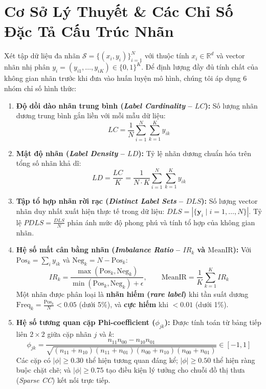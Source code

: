 \documentclass[11pt,a4paper]{article}
\begin{document}
\section{Cơ Sở Lý Thuyết \& Các Chỉ Số Đặc Tả Cấu Trúc Nhãn}
Xét tập dữ liệu đa nhãn $\mathcal{S} = \{(x_i, y_i)\}_{i=1}^N$ với thuộc tính $x_i \in \mathbb{R}^d$ và vector nhãn nhị phân $y_i = (y_{i1}, \dots, y_{iK}) \in \{0, 1\}^K$. Để định lượng đầy đủ tính chất của không gian nhãn trước khi đưa vào huấn luyện mô hình, chúng tôi áp dụng 6 nhóm chỉ số hình thức:
\begin{enumerate}[leftmargin=*]
  \item \textbf{Độ dồi dào nhãn trung bình (\textit{Label Cardinality} -- $LC$):} Số lượng nhãn dương trung bình gắn liền với mỗi mẫu dữ liệu:
  \begin{equation}
    LC = \frac{1}{N} \sum_{i=1}^N \sum_{k=1}^K y_{ik}
  \end{equation}
  \item \textbf{Mật độ nhãn (\textit{Label Density} -- $LD$):} Tỷ lệ nhãn dương chuẩn hóa trên tổng số nhãn khả dĩ:
  \begin{equation}
    LD = \frac{LC}{K} = \frac{1}{N \cdot K} \sum_{i=1}^N \sum_{k=1}^K y_{ik}
  \end{equation}
  \item \textbf{Tập tổ hợp nhãn rời rạc (\textit{Distinct Label Sets} -- $DLS$):} Số lượng vector nhãn duy nhất xuất hiện thực tế trong dữ liệu: $DLS = |\{\mathbf{y}_i \mid i=1,\dots,N\}|$. Tỷ lệ $PDLS = \frac{DLS}{N}$ phản ánh mức độ phong phú và tính tổ hợp của không gian nhãn.
  \item \textbf{Hệ số mất cân bằng nhãn (\textit{Imbalance Ratio} -- $IR_k$ và $\mathrm{MeanIR}$):} Với $\mathrm{Pos}_k = \sum_{i} y_{ik}$ và $\mathrm{Neg}_k = N - \mathrm{Pos}_k$:
  \begin{equation}
    IR_k = \frac{\max(\mathrm{Pos}_k, \mathrm{Neg}_k)}{\min(\mathrm{Pos}_k, \mathrm{Neg}_k) + \epsilon}, \qquad \mathrm{MeanIR} = \frac{1}{K} \sum_{k=1}^K IR_k
  \end{equation}
  Một nhãn được phân loại là \textbf{nhãn hiếm (\textit{rare label})} khi tần suất dương $\mathrm{Freq}_k = \frac{\mathrm{Pos}_k}{N} < 0.05$ (dưới 5\%), và \textbf{cực hiếm} khi $< 0.01$ (dưới 1\%).
  \item \textbf{Hệ số tương quan cặp Phi-coefficient ($\phi_{jk}$):} Được tính toán từ bảng tiếp liên $2 \times 2$ giữa cặp nhãn $j$ và $k$:
  \begin{equation}
    \phi_{jk} = \frac{n_{11} n_{00} - n_{10} n_{01}}{\sqrt{(n_{11} + n_{10})(n_{11} + n_{01})(n_{00} + n_{10})(n_{00} + n_{01})}} \in [-1, 1]
  \end{equation}
  Các cặp có $|\phi| \ge 0.30$ thể hiện tương quan đáng kể; $|\phi| \ge 0.50$ thể hiện ràng buộc chặt chẽ; và $|\phi| \ge 0.75$ tạo điều kiện lý tưởng cho chuỗi đồ thị thưa (\textit{Sparse CC}) kết nối trực tiếp.
\end{enumerate}
\end{document}
